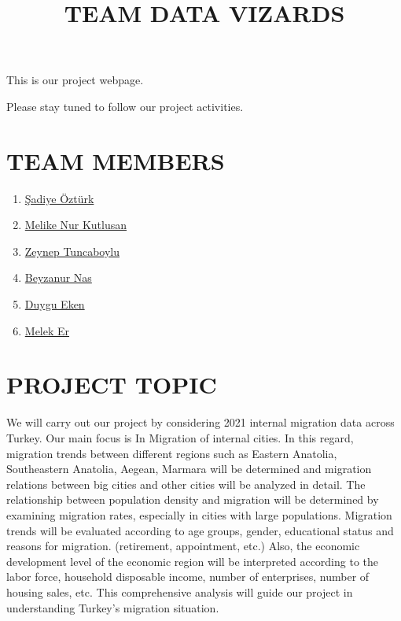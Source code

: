 \documentclass[
  11pt,
  a4paper,
  DIV=11,
  numbers=noendperiod]{scrartcl}
\title{TEAM DATA VIZARDS}
\author{}
\date{}
\begin{document}
\maketitle
\ifdefined\Shaded\renewenvironment{Shaded}{\begin{tcolorbox}[frame hidden, breakable, borderline west={3pt}{0pt}{shadecolor}, sharp corners, boxrule=0pt, interior hidden, enhanced]}{\end{tcolorbox}}\fi

This is our project webpage.

Please stay tuned to follow our project activities.

\hypertarget{team-members}{%
\section{TEAM MEMBERS}\label{team-members}}

\begin{enumerate}
\def\labelenumi{\arabic{enumi}.}
\item
  \href{https://emu-hacettepe-analytics.github.io/emu430-fall2023-sadiye-1/}{Şadiye
  Öztürk}
\item
  \href{https://emu-hacettepe-analytics.github.io/emu430-fall2023-melikekutlusan/}{Melike
  Nur Kutlusan}
\item
  \href{https://emu-hacettepe-analytics.github.io/emu430-fall2023-zeyneptnc/}{Zeynep
  Tuncaboylu}
\item
  \href{https://emu-hacettepe-analytics.github.io/emu430-fall2023-beyzanurnas/}{Beyzanur
  Nas}
\item
  \href{https://github.com/emu-hacettepe-analytics/emu430-fall2023-dygekn}{Duygu
  Eken}
\item
  \href{https://github.com/emu-hacettepe-analytics/emu430-fall2023-Meleker.git}{Melek
  Er}
\end{enumerate}

\hypertarget{project-topic}{%
\section{PROJECT TOPIC}\label{project-topic}}

We will carry out our project by considering 2021 internal migration
data across Turkey. Our main focus is In Migration of internal cities.
In this regard, migration trends between different regions such as
Eastern Anatolia, Southeastern Anatolia, Aegean, Marmara will be
determined and migration relations between big cities and other cities
will be analyzed in detail. The relationship between population density
and migration will be determined by examining migration rates,
especially in cities with large populations. Migration trends will be
evaluated according to age groups, gender, educational status and
reasons for migration. (retirement, appointment, etc.) Also, the
economic development level of the economic region will be interpreted
according to the labor force, household disposable income, number of
enterprises, number of housing sales, etc. This comprehensive analysis
will guide our project in understanding Turkey's migration situation.
\end{document}
